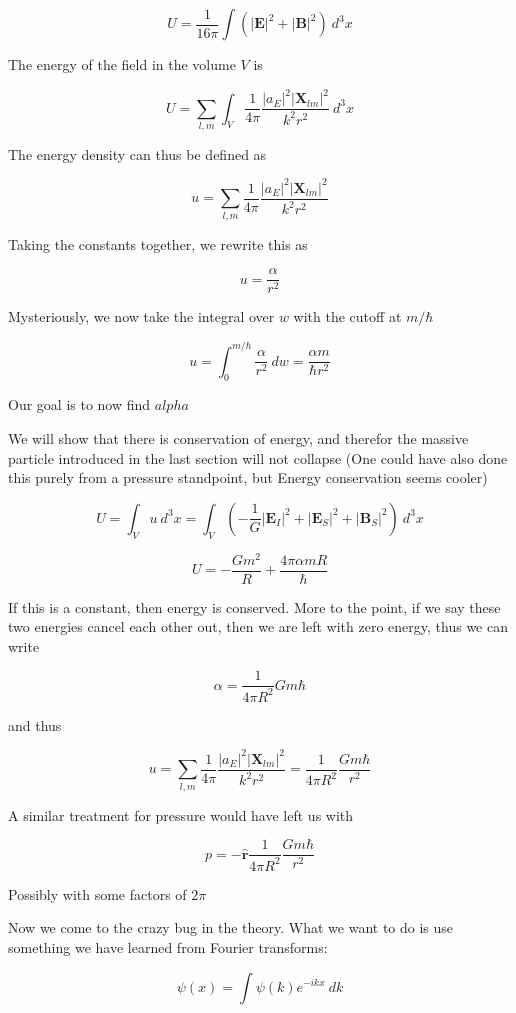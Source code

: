 \documentclass {article}
\renewcommand\vec{\mathbf}
\let\OldHat\hat
\renewcommand{\hat}[1]{\OldHat{\mathbf{#1}}}
\begin{document}
$$U = \frac 1 {16 \pi} \int \left( |\vec E  |^2 + |\vec B |^2 \right) ~ d^3x $$

The energy of the field in the volume $V$ is


$$U  =\sum_{l, m}   \int_V \frac 1 {4 \pi}  \frac {|a_E|^2 |\vec X_{lm} |^2}{k^2 r^2} ~ d^3x $$

The energy density can thus be defined as

$$u  = \sum_{l, m}   \frac 1 {4\pi}  \frac {|a_E|^2 |\vec X_{lm} |^2}{k^2 r^2} $$

Taking the constants together, we rewrite this as 

$$u  =  \frac {\alpha}{r^2} $$


Mysteriously, we now take the integral over $w$ with the cutoff at $m/ \hbar$

$$u = \int_0^{m/ \hbar}  \frac {\alpha}{r^2} ~dw = \frac {\alpha m}{\hbar r^2}$$

Our goal is to now find $alpha$


We will show that there is conservation of energy, and therefor the massive particle introduced in the last section will not collapse (One could have also done this purely from a pressure standpoint, but Energy conservation seems cooler)

$$U = \int_V u ~ d^3x = \int_V \left( - \frac 1 G |\vec E_I |^2  +  |\vec E_S |^2  +  |\vec B_S |^2 \right) ~ d^3x$$

$$U = - \frac {Gm^2} R + \frac {4 \pi \alpha m R} \hbar$$

If this is a constant, then energy is conserved. More to the point, if we say these two energies cancel each other out, then we are left with zero energy, thus we can write

$$\alpha = \frac 1 {4 \pi R^2} Gm \hbar$$

and thus 

$$u  = \sum_{l, m}   \frac 1 {4\pi}  \frac {|a_E|^2 |\vec X_{lm} |^2}{k^2 r^2}  =  \frac 1 {4 \pi R^2} \frac {Gm \hbar} {r^2} $$

A similar treatment for pressure would have left us with 

$$p = - \hat r \frac 1 {4 \pi R^2} \frac {Gm \hbar} {r^2} $$

Possibly with some factors of $2 \pi$

Now we come to the crazy bug in the theory. What we want to do is use something we have learned from Fourier transforms:

$$\psi (x) = \int \psi(k)e^{-ikx} ~ dk $$
\end{document}
